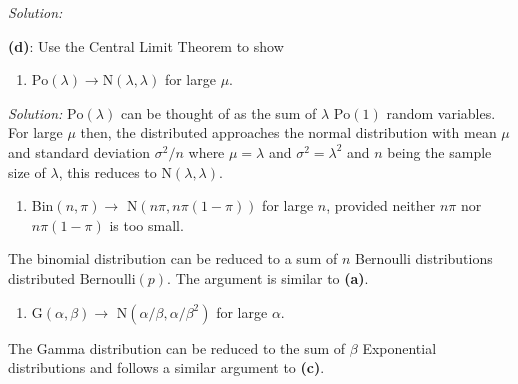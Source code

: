 \documentclass[]{article}
\providecommand{\tightlist}{%
  \setlength{\itemsep}{0pt}\setlength{\parskip}{0pt}}
\begin{document}
\emph{Solution: }

\textbf{(d)}: Use the Central Limit Theorem to show

\begin{enumerate}
\def\labelenumi{\roman{enumi}.}
\tightlist
\item
  \(\text{Po}(\lambda) \rightarrow \text{N}(\lambda, \lambda)\) for
  large \(\mu\).
\end{enumerate}

\emph{Solution: } \(\text{Po}(\lambda)\) can be thought of as the sum of
\(\lambda \text{ Po}(1)\) random variables. For large \(\mu\) then, the
distributed approaches the normal distribution with mean \(\mu\) and
standard deviation \(\sigma^2/n\) where \(\mu = \lambda\) and
\(\sigma^2 = \lambda^2\) and \(n\) being the sample size of \(\lambda\),
this reduces to \(\text{N}(\lambda, \lambda)\).

\begin{enumerate}
\def\labelenumi{\roman{enumi}.}
\tightlist
\item
  Bin\((n, \pi) \rightarrow\) N\((n\pi, n\pi(1 - \pi))\) for large
  \(n\), provided neither \(n\pi\) nor \(n\pi(1- \pi)\) is too small.
\end{enumerate}

The binomial distribution can be reduced to a sum of \(n\) Bernoulli
distributions distributed \(\text{Bernoulli}(p)\). The argument is
similar to \textbf{(a)}.

\begin{enumerate}
\def\labelenumi{\roman{enumi}.}
\tightlist
\item
  G\((\alpha, \beta) \rightarrow\) N\((\alpha/\beta, \alpha/\beta^2)\)
  for large \(\alpha\).
\end{enumerate}

The Gamma distribution can be reduced to the sum of \(\beta\)
Exponential distributions and follows a similar argument to
\textbf{(c)}.
\end{document}
